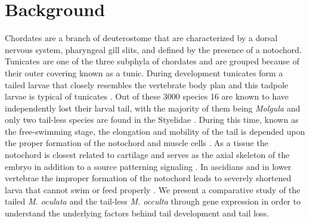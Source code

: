 \chapter{Background}
Chordates are a branch of deuterostome that are characterized by a dorsal nervous system, pharyngeal gill slits, and defined by the presence of a notochord. Tunicates are one of the three subphyla of chordates and are grouped because of their outer covering known as a tunic. During development tunicates form a tailed larvae that closely resembles the vertebrate body plan \cite{jeffery_minireview_2002} and this tadpole larvae is typical of  tunicates \cite{huber_evolution_2000}. Out of these 3000 species 16 are known to have independently lost their larval tail, with the majority of them being \textit{Molgula} \cite{berrill_studies_1931,swalla_interspecific_1990} and only two tail-less species are found in the Styelidae \cite{huber_evolution_2000}. During this time, known as the free-swimming stage, the elongation and mobility of the tail is depended upon the proper formation of the notochord and muscle cells \cite{satoh_ascidian_2003}. As a tissue the notochord is closest related to cartilage and serves as the axial skeleton of the embryo in addition to a source patterning signaling \cite{jeffery_evolution_1999}. In ascidians and in lower vertebrae the improper formation of the notochord leads to severely shortened larva that cannot swim or feed properly \cite{di_gregorio_tail_2002,jiang_ascidian_2005,stemple_structure_2005}. We present a comparative study of the tailed \textit{M. oculata} and the tail-less \textit{M. occulta} through gene expression in order to understand the underlying factors behind tail development and tail loss.

